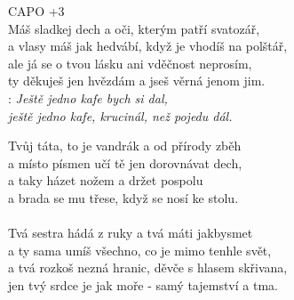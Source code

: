 
CAPO +3\\

Máš sladkej dech a oči, kterým patří svatozář,\\
a vlasy máš jak hedvábí, když je vhodíš na polštář,\\
ale já se o tvou lásku ani vděčnost neprosím,\\
ty děkuješ jen hvězdám a jseš věrná jenom jim.\\

\textregistered:
\emph{
Ještě jedno kafe bych si dal,\\
ještě jedno kafe, krucinál, než pojedu dál.\\
}

\begin{Large}

Tvůj táta, to je vandrák a od přírody zběh\\
a místo písmen učí tě jen dorovnávat dech,\\
a taky házet nožem a držet pospolu\\
a brada se mu třese, když se nosí ke stolu.\\

\textregistered{}\\

Tvá sestra hádá z ruky a tvá máti jakbysmet\\
a ty sama umíš všechno, co je mimo tenhle svět,\\
a tvá rozkoš nezná hranic, děvče s hlasem skřivana,\\
jen tvý srdce je jak moře - samý tajemství a tma.\\

\textregistered{}\\

\end{Large}

\newpage
